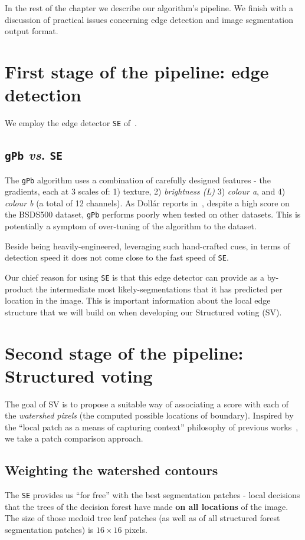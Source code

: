 In the rest of the chapter we describe our algorithm's pipeline. We finish with a discussion of %
practical issues concerning edge detection and image segmentation output format.

\section[First stage of the pipeline: Structured edge]{First stage of the pipeline: edge detection} %
We employ the edge detector {\tt SE} of~\cite{DollarICCV13edges,Dollar2015PAMI}.

\subsection{{\tt gPb} \emph{vs}. {\tt SE}}
The {\tt gPb} algorithm uses a combination of carefully designed features - the gradients, each at 3 scales of: 1) texture, 2) {\it brightness (L)} 3) {\it colour a}, and 4) {\it colour b} (a total of 12 channels). As Doll\'ar reports in~\cite{DollarICCV13edges}, despite a high score on the BSDS500 dataset, {\tt gPb} performs poorly when tested on other datasets. This is potentially a symptom of over-tuning of the algorithm to the dataset.

Beside being heavily-engineered, leveraging such hand-crafted cues, in terms of detection speed it does not come close to the fast speed %
of {\tt SE}.

Our chief reason for using {\tt SE} 
is that this edge detector can provide as a by-product the intermediate most likely-segmentations that it has predicted per location in the image. This is important information about the local edge structure that we will build on when developing our Structured voting (SV).

\section{Second stage of the pipeline: Structured voting}
\label{sec:ch4-SE-SV-UCM_SV_details}
The goal of SV is to propose a suitable way of associating a score with each of the {\it watershed pixels} (the computed possible locations of boundary). Inspired by the ``local patch as a means of capturing context'' philosophy of previous works~\cite{Dollar2006supervised,LimZD13,DollarICCV13edges}, we take a patch comparison approach.

\subsection{Weighting the watershed contours} %
The {\tt SE} provides us ``for free'' with the best segmentation patches - local decisions that the trees of the decision forest have made {\bf on all locations} of the image. The size of those medoid tree leaf patches (as well as of all structured forest segmentation patches) is $16\times 16$ pixels.

